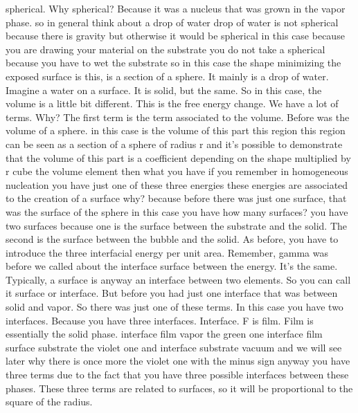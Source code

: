 spherical. Why spherical? Because it was a nucleus that was grown in the vapor phase. so in general think about a drop of water drop of water is not spherical because there is gravity but otherwise it would be spherical in this case because you are drawing your material on the substrate you do not take a spherical because you have to wet the substrate so in this case the shape minimizing the exposed surface is this, is a section of a sphere. It mainly is a drop of water. Imagine a water on a surface. It is solid, but the same. So in this case, the volume is a little bit different. This is the free energy change. We have a lot of terms. Why? The first term is the term associated to the volume. Before was the volume of a sphere. in this case is the volume of this part this region this region can be seen as a section of a sphere of radius r and it's possible to demonstrate that the volume of this part is a coefficient depending on the shape multiplied by r cube the volume element then what you have if you remember in homogeneous nucleation you have just one of these three energies these energies are associated to the creation of a surface why? because before there was just one surface, that was the surface of the sphere in this case you have how many surfaces? you have two surfaces because one is the surface between the substrate and the solid. The second is the surface between the bubble and the solid. As before, you have to introduce the three interfacial energy per unit area. Remember, gamma was before we called about the interface surface between the energy. It's the same. Typically, a surface is anyway an interface between two elements. So you can call it surface or interface. But before you had just one interface that was between solid and vapor. So there was just one of these terms. In this case you have two interfaces. Because you have three interfaces. Interface. F is film. Film is essentially the solid phase. interface film vapor the green one interface film surface substrate the violet one and interface substrate vacuum and we will see later why there is once more the violet one with the minus sign anyway you have three terms due to the fact that you have three possible interfaces between these phases. These three terms are related to surfaces, so it will be proportional to the square of the radius.
